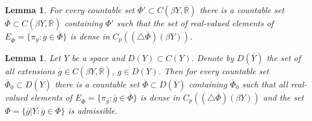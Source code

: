 \documentclass[12pt]{amsart}
\newtheorem{lem}[thm]{Lemma}
\begin{document}
\begin{lem}\cite[Lemma 4.2]{ev}
For every countable set $\overline\Phi'\subset C(\beta Y,\overline{\mathbb R})$ there is a countable set $\overline\Phi\subset C(\beta Y,\overline{\mathbb R})$ containing $\overline\Phi'$ such that 
the set of real-valued elements of $E_{\overline\Phi}=\{\pi_g: g\in\overline\Phi\}$ is dense in
$C_p((\triangle\overline\Phi)(\beta Y))$.
\end{lem}
\begin{lem}
Let $Y$ be a space and $D(Y)\subset C(Y)$. Denote by $D(\overline Y)$ the set of all extensions $\overline g\in C(\beta Y,\overline{\mathbb R})$, $g\in D(Y)$.
Then for every countable 
set $\overline\Phi_0\subset D(\overline Y)$ there is  a countable set $\overline\Phi\subset D(\overline Y)$ containing $\overline\Phi_0$ such that all real-valued elements of $E_{\overline\Phi}=\{\pi_{\overline g}: \overline g\in\overline\Phi\}$ is dense in
$C_p((\triangle\overline\Phi)(\beta Y))$ and the set $\Phi=\{\overline g|Y:\overline g\in\overline\Phi\}$ is admissible. 
\end{lem}
\end{document}
